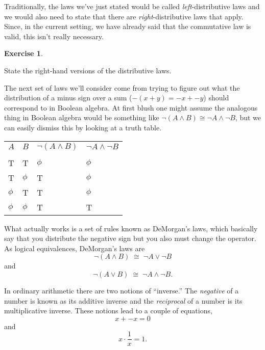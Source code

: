\documentclass[10pt,]{book}
\theoremstyle{plain}
\theoremstyle{definition}
\theoremstyle{definition}
\newtheorem{exercise}[theorem]{Exercise}
\numberwithin{equation}{section}
\newcommand{\hrulethin}  {\noalign{\hrule height 0.04em}}
\begin{document}
    Traditionally, the laws we've just stated would be called
    \emph{left}-distributive laws and we would also need to state
    that there are \emph{right}-distributive laws that apply. Since,
    in the current setting, we have already said that the commutative
    law is valid, this isn't really necessary.
\begin{exercise}\label{exercise-11}

        State the right-hand versions of the distributive laws.
\end{exercise}
\par

    The next set of laws we'll consider come from trying to
    figure out what the distribution of a minus sign over a sum
    (\(-(x+y) = -x + -y\))
    should correspond to in Boolean algebra. At first blush one
    might assume the analogous thing in Boolean algebra would be
    something like \({\lnot}(A \land B) \cong {\lnot}A \land {\lnot}B\),
    but we can easily dismiss this by looking at a truth table.
\begin{tabular}{llll}
\(A\)&\(B\)&\({\lnot}(A \land B)\)&\({\lnot}A \land {\lnot}B\)\tabularnewline[0pt]
&&&\tabularnewline\hrulethin
T&T&\(\phi\)&\(\phi\)\tabularnewline[0pt]
T&\(\phi\)&T&\(\phi\)\tabularnewline[0pt]
\(\phi\)&T&T&\(\phi\)\tabularnewline[0pt]
\(\phi\)&\(\phi\)&T&T
\end{tabular}
\par

    What actually works is a set of rules known as
    DeMorgan's laws, which
    basically say that you distribute the negative sign but
    you also must change the operator. As logical equivalences,
    DeMorgan's laws are
    \begin{equation*}
      {\lnot}(A \land B) \; \cong \; {\lnot}A \lor {\lnot}B
    \end{equation*}
    and
    \begin{equation*}
      {\lnot}(A \lor B) \; \cong \; {\lnot}A \land {\lnot}B.
    \end{equation*}
\par

    In ordinary arithmetic there are two notions of ``inverse.'' The
    \emph{negative} of a number is known as its additive inverse and
    the \emph{reciprocal} of a number is its multiplicative inverse.
    These notions lead to a couple of equations,
    \begin{equation*}
      x + -x = 0
    \end{equation*}
    and
    \begin{equation*}
      x \cdot \frac{1}{x} = 1.
    \end{equation*}
\par
\end{document}
